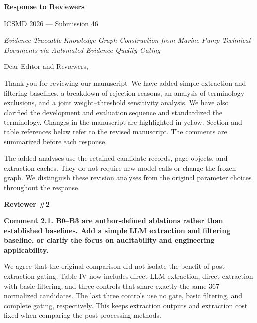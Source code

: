 \begingroup
\normalfont\fontsize{11}{14}\selectfont
\setlength{\parindent}{0pt}
\setlength{\parskip}{7pt}
\setlength{\emergencystretch}{2em}
\pagestyle{plain}
\newcommand{\responseitem}[2]{\par\Needspace{8\baselineskip}\bigskip\noindent\textbf{Comment #1. #2}\par\nopagebreak}
\begin{center}
{\Large\bfseries Response to Reviewers}\par
\medskip
ICSMD 2026 --- Submission 46\par
\textit{Evidence-Traceable Knowledge Graph Construction from Marine Pump Technical Documents via Automated Evidence-Quality Gating}
\end{center}

Dear Editor and Reviewers,

Thank you for reviewing our manuscript. We have added simple extraction and filtering baselines, a breakdown of rejection reasons, an analysis of terminology exclusions, and a joint weight--threshold sensitivity analysis. We have also clarified the development and evaluation sequence and standardized the terminology. Changes in the manuscript are highlighted in yellow. Section and table references below refer to the revised manuscript. The comments are summarized before each response.

The added analyses use the retained candidate records, page objects, and extraction caches. They do not require new model calls or change the frozen graph. We distinguish these revision analyses from the original parameter choices throughout the response.

\bigskip
{\large\bfseries Reviewer \#2}

\responseitem{2.1}{B0--B3 are author-defined ablations rather than established baselines. Add a simple LLM extraction and filtering baseline, or clarify the focus on auditability and engineering applicability.}

We agree that the original comparison did not isolate the benefit of post-extraction gating. Table IV now includes direct LLM extraction, direct extraction with basic filtering, and three controls that share exactly the same 367 normalized candidates. The last three controls use no gate, basic filtering, and complete gating, respectively. This keeps extraction outputs and extraction cost fixed when comparing the post-processing methods.

